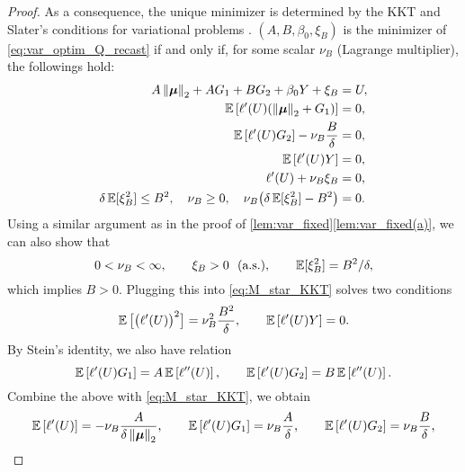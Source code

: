 \begin{proof}
    As a consequence, the unique minimizer is determined by the KKT and Slater's conditions for variational problems \cite[Theorem 2.9.2]{zalinescu2002convex}. $(A, B, \beta_0, \xi_B)$ is the minimizer of \cref{eq:var_optim_Q_recast} if and only if, for some scalar $\nu_B$ (Lagrange multiplier), the followings hold:
    \begin{equation}
    \label{eq:M_star_KKT}
    \begin{aligned}
        A \left\|{{\boldsymbol{\mu}}}\right\|_2 + A G_1 + B G_2 + \beta_0 Y + \xi_B & = U, \\
        \mathbb{E} \left[ \ell'(U) ( \left\|{{\boldsymbol{\mu}}}\right\|_2 + G_1 ) \right] & = 0, \\
        \mathbb{E} \left[ \ell'(U) G_2 \right] - \nu_B \frac{B}{\delta} & = 0, \\
        \mathbb{E} \left[ \ell'(U) Y   \right] & = 0, \\
        \ell'(U) + \nu_B \xi_B & = 0, \\
        \delta  \, \mathbb{E}[\xi_B^2] \le B^2, \quad
        \nu_B \ge 0, \quad
        \nu_B \bigl( \delta \, \mathbb{E}[\xi_B^2] - B^2 \bigr) & = 0.
    \end{aligned}
    \end{equation}
    Using a similar argument as in the proof of \cref{lem:var_fixed}\ref{lem:var_fixed(a)}, we can also show that
    \begin{equation*}
        0 < \nu_B < \infty,  \qquad  \xi_B > 0 \ \  (\text{a.s.}), \qquad \mathbb{E}[\xi_B^2] = B^2/\delta,
    \end{equation*}
    which implies $B > 0$. Plugging this into \cref{eq:M_star_KKT} solves two conditions
    \begin{equation}
    \label{eq:M_star_KKT-1}
        \mathbb{E} \, \bigl[ \bigl( \ell'(U) \bigr)^2 \bigr] = \nu_B^2 \frac{B^2}{\delta},
        \qquad
        \mathbb{E}\left[ \ell'(U) Y \right] = 0.
    \end{equation}
    By Stein's identity, we also have relation
    \begin{equation*}
        \mathbb{E}\left[ \ell'(U) G_1 \right] = A \, \mathbb{E}\left[ \ell''(U) \right],
        \qquad
        \mathbb{E}\left[ \ell'(U) G_2 \right] = B \, \mathbb{E}\left[ \ell''(U) \right].
    \end{equation*}
    Combine the above with \cref{eq:M_star_KKT}, we obtain
    \begin{align*}
        \E \left[ \ell'(U) \right] = -\nu_B \frac{A}{\delta\norm{\bmu}_2},
    \qquad
        \E \left[ \ell'(U) G_1 \right] = \nu_B \frac{A}{\delta},
    \qquad
        \E \left[ \ell'(U) G_2 \right] = \nu_B \frac{B}{\delta},

\end{align*}
\end{proof}
